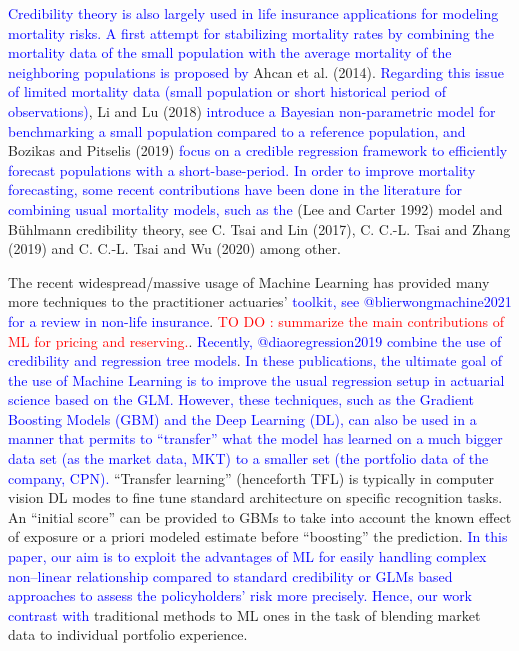 \documentclass[
]{article}
\begin{document}
\textcolor{blue}{Credibility theory is also largely used in life insurance applications for modeling mortality risks. A first attempt for stabilizing mortality rates by combining the mortality data of the small population with the average mortality of the neighboring populations is proposed by}
Ahcan et al. (2014).
\textcolor{blue}{Regarding this issue of limited mortality data (small population or short historical period of observations)},
Li and Lu (2018)
\textcolor{blue}{introduce a Bayesian non-parametric model for benchmarking a small population compared to a reference population, and}
Bozikas and Pitselis (2019)
\textcolor{blue}{focus on a credible regression framework to efficiently forecast populations with a short-base-period. In order to improve mortality forecasting, some recent contributions have been done in the literature for combining usual mortality models, such as the}
(Lee and Carter 1992) model and Bühlmann credibility theory, see C. Tsai
and Lin (2017), C. C.-L. Tsai and Zhang (2019) and C. C.-L. Tsai and Wu
(2020) among other.

The recent widespread/massive usage of Machine Learning has provided
many more techniques to the practitioner actuaries'
\textcolor{blue}{toolkit, see @blierwongmachine2021 for a review in non-life insurance}.
\textcolor{red}{TO DO : summarize the main contributions of ML for pricing and reserving.}.
\textcolor{blue}{Recently, @diaoregression2019 combine the use of credibility and regression tree models}.
\textcolor{blue}{In these publications, the ultimate goal of the use of Machine Learning is to improve the usual regression setup in actuarial science based on the GLM. However, these techniques, such as  the Gradient Boosting Models (GBM) and the Deep Learning (DL), can also be used in a manner that permits to “transfer” what the model has \textcolor{blue}{learned} on a much bigger data set (as the market data, MKT) to a smaller set (the portfolio data of the company, CPN).}
``Transfer learning'' (henceforth TFL) is typically in computer vision
DL modes to fine tune standard architecture on specific recognition
tasks. An ``initial score'' can be provided to GBMs to take into account
the known effect of exposure or a priori modeled estimate before
``boosting'' the prediction.
\textcolor{blue}{In this paper, our aim is to exploit the advantages of ML for easily handling complex non–linear relationship compared to standard credibility or GLMs based approaches to assess the policyholders’ risk more precisely. Hence, our work contrast with}
traditional methods to ML ones in the task of blending market data to
individual portfolio experience.
\end{document}
